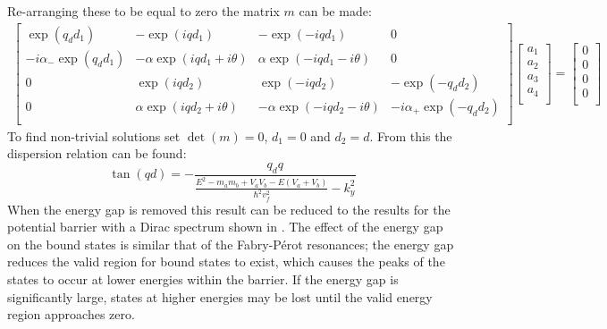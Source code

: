 \documentclass[12pt,a4paper]{report}
\begin{document}
				Re-arranging these to be equal to zero the matrix $m$ can be made:
				\begin{align}
					\left[\begin{array}{cccc}
						\exp(q_{d}d_{1})&-\exp(iqd_{1})&-\exp(-iqd_{1})&0\\
						-i\alpha_{-}\exp(q_{d}d_{1})&-\alpha \exp(iqd_{1}+i\theta)&\alpha \exp(-iqd_{1}-i\theta)&0\\
						0&\exp(iqd_{2})&\exp(-iqd_{2})&-\exp(-q_{d}d_{2})\\
						0&\alpha \exp(iqd_{2}+i\theta)&-\alpha \exp(-iqd_{2}-i\theta)&-i\alpha_{+}\exp(-q_{d}d_{2})\\
					\end{array}\right]
					\left[\begin{array}{cccc}
						a_{1}\\
						a_{2}\\
						a_{3}\\
						a_{4}\\
					\end{array}\right]=
					\left[\begin{array}{cccc}
						0\\
						0\\
						0\\
						0\\
					\end{array}\right]
				\end{align}
				To find non-trivial solutions set $\det(m)=0$, $d_{1}=0$ and $d_{2}=d$. From this the dispersion relation can be found:
				\begin{equation}
					\tan(qd)=-\frac{q_{d}q}{\frac{E^{2}-m_{a}m_{b}+V_{a}V_{b}-E\left(V_{a}+V_{b}\right)}{\hbar^{2}v_{f}^{2}}-k_{y}^{2}}
					\label{boundstates}
				\end{equation}
				When the energy gap is removed this result can be reduced to the results for the potential barrier with a Dirac spectrum shown in \cite{b3}. The effect of the energy gap on the bound states is similar that of the Fabry-P\'{e}rot resonances; the energy gap reduces the valid region for bound states to exist, which causes the peaks of the states to occur at lower energies within the barrier. If the energy gap is significantly large, states at higher energies may be lost until the valid energy region approaches zero.
\end{document}
